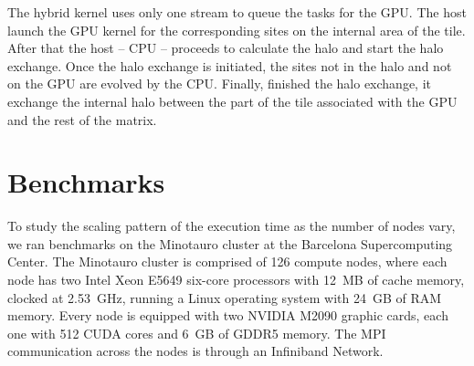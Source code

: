 

The hybrid kernel uses only one stream to queue the tasks for the GPU. The host launch the GPU kernel for the corresponding sites on the internal area of the tile. After that the host -- CPU -- proceeds to calculate the halo and start the halo exchange. Once the halo exchange is initiated, the sites not in the halo and not on the GPU are evolved by the CPU. Finally, finished the halo exchange, it exchange the internal halo between the part of the tile associated with the GPU and the rest of the matrix.

\section{Benchmarks}
To study the scaling pattern of the execution time as the number of nodes vary, we ran benchmarks on the Minotauro cluster at the Barcelona Supercomputing Center. The Minotauro cluster is comprised of 126 compute nodes, where each node has two Intel Xeon E5649 six-core processors with 12~MB of cache memory, clocked at 2.53~GHz, running a Linux operating system with 24~GB of RAM memory. Every node is equipped with two NVIDIA M2090 graphic cards, each one with 512 CUDA cores and 6~GB of GDDR5 memory. The MPI communication across the nodes is through an Infiniband Network. 


